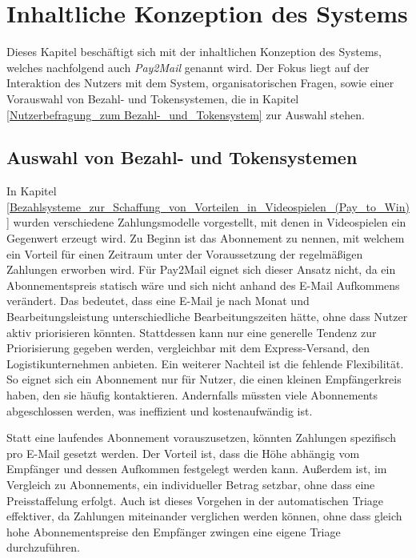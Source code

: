 
\chapter{Inhaltliche Konzeption des Systems}
\label{Inhaltliche_Konzeption_des_Systems}

Dieses Kapitel beschäftigt sich mit der inhaltlichen Konzeption des Systems, welches nachfolgend auch \textit{Pay2Mail} genannt wird. Der Fokus liegt auf der Interaktion des Nutzers mit dem System, organisatorischen Fragen, sowie einer Vorauswahl von Bezahl- und Tokensystemen, die in Kapitel \ref{Nutzerbefragung_zum Bezahl-_und_Tokensystem} zur Auswahl stehen.

\section{Auswahl von Bezahl- und Tokensystemen}
\label{Auswahl_von_Bezahl-_und_Tokensystemen}
In Kapitel \ref{Bezahlsysteme_zur_Schaffung_von_Vorteilen_in_Videospielen_(Pay_to_Win)} wurden verschiedene Zahlungsmodelle vorgestellt, mit denen in Videospielen ein Gegenwert erzeugt wird. Zu Beginn ist das Abonnement zu nennen, mit welchem ein Vorteil für einen Zeitraum unter der Voraussetzung der regelmäßigen Zahlungen erworben wird. Für Pay2Mail eignet sich dieser Ansatz nicht, da ein Abonnementspreis statisch wäre und sich nicht anhand des E-Mail Aufkommens verändert. Das bedeutet, dass eine E-Mail je nach Monat und Bearbeitungsleistung unterschiedliche Bearbeitungszeiten hätte, ohne dass Nutzer aktiv priorisieren könnten. Stattdessen kann nur eine generelle Tendenz zur Priorisierung gegeben werden, vergleichbar mit dem Express-Versand, den Logistikunternehmen anbieten. Ein weiterer Nachteil ist die fehlende Flexibilität. So eignet sich ein Abonnement nur für Nutzer, die einen kleinen Empfängerkreis haben, den sie häufig kontaktieren. Andernfalls müssten viele Abonnements abgeschlossen werden, was ineffizient und kostenaufwändig ist.

Statt eine laufendes Abonnement vorauszusetzen, könnten Zahlungen spezifisch pro E-Mail gesetzt werden. Der Vorteil ist, dass die Höhe abhängig vom Empfänger und dessen Aufkommen festgelegt werden kann. Außerdem ist, im Vergleich zu Abonnements, ein individueller Betrag setzbar, ohne dass eine Preisstaffelung erfolgt. Auch ist dieses Vorgehen in der automatischen Triage effektiver, da Zahlungen miteinander verglichen werden können, ohne dass gleich hohe Abonnementspreise den Empfänger zwingen eine eigene Triage durchzuführen. 

